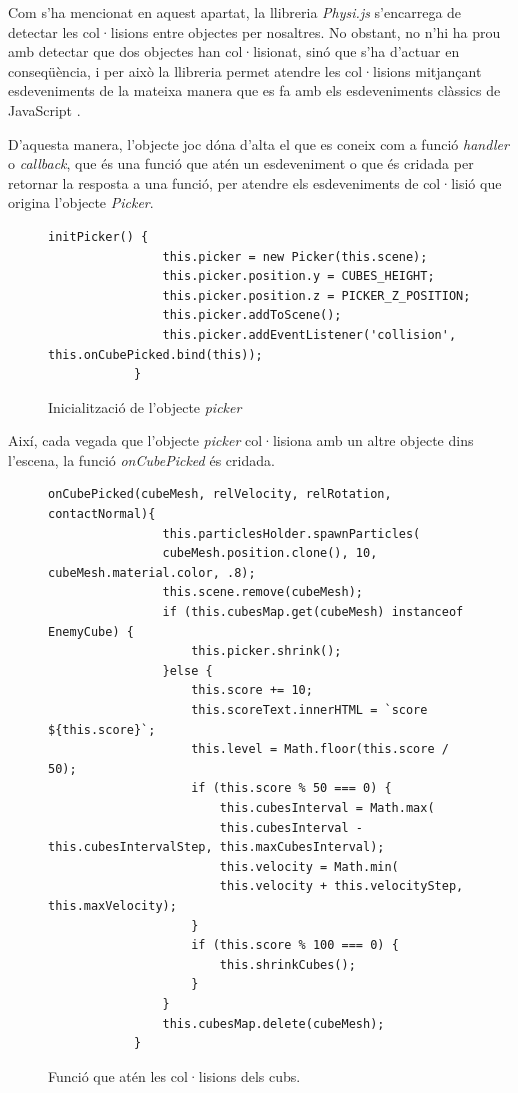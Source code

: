 \documentclass[12pt,a4paper,catalan]{article}
\begin{document}
	Com s'ha mencionat en aquest apartat, la llibreria \textit{Physi.js} s'encarrega de detectar les col·lisions entre objectes per nosaltres. No obstant, no n'hi ha prou amb detectar que dos objectes han col·lisionat, sinó que s'ha d'actuar en conseqüència, i per això la llibreria permet atendre les col·lisions mitjançant esdeveniments de la mateixa manera que es fa amb els esdeveniments clàssics de JavaScript \cite{js-event}.
	
	D'aquesta manera, l'objecte joc dóna d'alta el que es coneix com a funció \textit{handler} o \textit{callback}, que és una funció que atén un esdeveniment o que és cridada per retornar la resposta a una funció, per atendre els esdeveniments de col·lisió que origina l'objecte \textit{Picker}.
	\begin{figure}[H]
		\begin{lstlisting}[gobble=12, tabsize=4]
			initPicker() {
				this.picker = new Picker(this.scene);
				this.picker.position.y = CUBES_HEIGHT;
				this.picker.position.z = PICKER_Z_POSITION;
				this.picker.addToScene();
				this.picker.addEventListener('collision', this.onCubePicked.bind(this));
			}
		\end{lstlisting}
		\caption{Inicialització de l'objecte \textit{picker}}
		\label{fig:picker-init}
	\end{figure}
	Així, cada vegada que l'objecte \textit{picker} col·lisiona amb un altre objecte dins l'escena, la funció \textit{onCubePicked} és cridada.
	\begin{figure}[H]
		\begin{lstlisting}[gobble=12, tabsize=4]
			onCubePicked(cubeMesh, relVelocity, relRotation, contactNormal){
				this.particlesHolder.spawnParticles(
				cubeMesh.position.clone(), 10, cubeMesh.material.color, .8);
				this.scene.remove(cubeMesh);
				if (this.cubesMap.get(cubeMesh) instanceof EnemyCube) {
					this.picker.shrink();
				}else {
					this.score += 10;
					this.scoreText.innerHTML = `score ${this.score}`;
					this.level = Math.floor(this.score / 50);
					if (this.score % 50 === 0) {
						this.cubesInterval = Math.max(
						this.cubesInterval - this.cubesIntervalStep, this.maxCubesInterval);
						this.velocity = Math.min(
						this.velocity + this.velocityStep, this.maxVelocity);
					}
					if (this.score % 100 === 0) {
						this.shrinkCubes();
					}
				}
				this.cubesMap.delete(cubeMesh);
			}
		\end{lstlisting}
		\caption{Funció que atén les col·lisions dels cubs.}
		\label{fig:oncubepicked}
	\end{figure}
\end{document}
